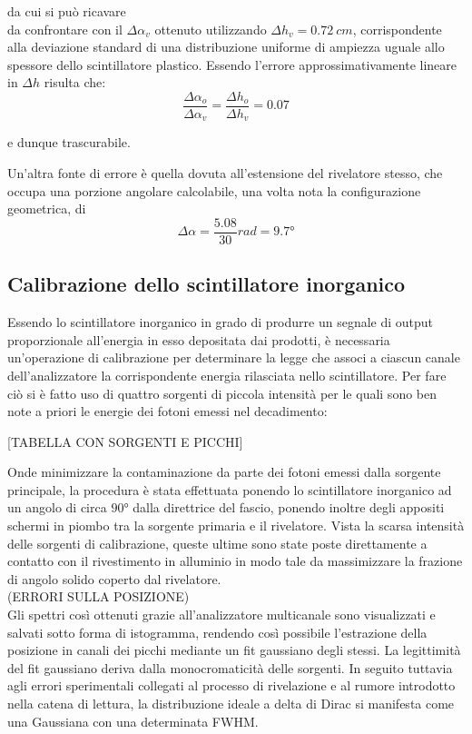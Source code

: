 \documentclass[5pt]{article}
\begin{document}
da cui si può ricavare \\

da confrontare con il $\Delta \alpha_v$ ottenuto utilizzando $\Delta h_v = 0.72 \ cm$, corrispondente alla deviazione standard di una distribuzione uniforme di ampiezza uguale allo spessore dello scintillatore plastico. Essendo l'errore approssimativamente lineare in $\Delta h$ risulta che: \\
\begin{equation}
\frac{\Delta \alpha_o}{\Delta \alpha_v} = \frac{\Delta h_o}{\Delta h_v} = 0.07 
\end{equation}

e dunque trascurabile.

Un'altra fonte di errore è quella dovuta all'estensione del rivelatore stesso, che occupa una porzione angolare calcolabile, una volta nota la configurazione geometrica, di \\
\begin{equation}
\Delta \alpha = \frac{5.08}{30} rad = 9.7°
\nonumber
\end{equation}





\subsection{Calibrazione dello scintillatore inorganico}

Essendo lo scintillatore inorganico in grado di produrre un segnale di output proporzionale all'energia in esso depositata dai prodotti, è necessaria un'operazione di calibrazione per determinare la legge che associ a ciascun canale dell'analizzatore la corrispondente energia rilasciata nello scintillatore. 
Per fare ciò si è fatto uso di quattro sorgenti di piccola intensità per le quali sono ben note a priori le energie dei fotoni emessi nel decadimento:

[TABELLA CON SORGENTI E PICCHI]

Onde minimizzare la contaminazione da parte dei fotoni emessi dalla sorgente principale, la procedura è stata effettuata ponendo lo scintillatore inorganico ad un angolo di circa $90°$ dalla direttrice del fascio, ponendo inoltre degli appositi schermi in piombo tra la sorgente primaria e il rivelatore. Vista la scarsa intensità delle sorgenti di calibrazione, queste ultime sono state poste direttamente a contatto con il rivestimento in alluminio in modo tale da massimizzare la frazione di angolo solido coperto dal rivelatore.\\
(ERRORI SULLA POSIZIONE)\\
Gli spettri così ottenuti grazie all'analizzatore multicanale sono visualizzati e salvati sotto forma di istogramma, rendendo così possibile l'estrazione della posizione in canali dei picchi mediante un fit gaussiano degli stessi. La legittimità del fit gaussiano deriva dalla monocromaticità delle sorgenti. In seguito tuttavia agli errori sperimentali collegati al processo di rivelazione e al rumore introdotto nella catena di lettura, la distribuzione ideale a delta di Dirac si manifesta come una Gaussiana con una determinata FWHM.\\
\end{document}
